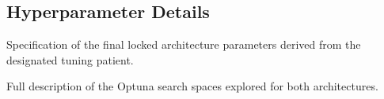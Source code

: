 \begin{appendix}
\chapter{Hyperparameter Details} \label{appendix:hyperparams}
\begin{planned}
    \item Specification of the final locked architecture parameters derived from the designated tuning patient.
    \item Full description of the Optuna search spaces explored for both architectures.
\end{planned}

\end{appendix}